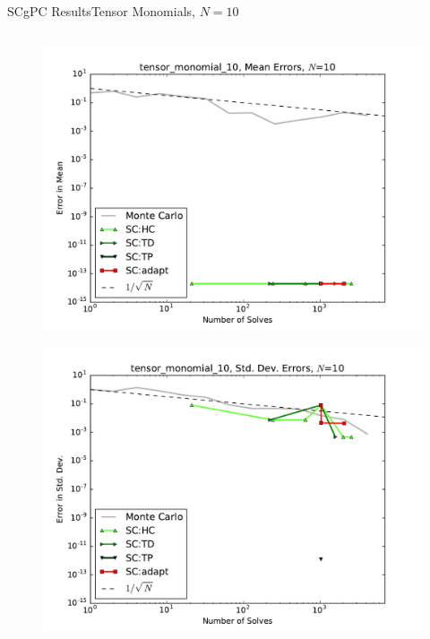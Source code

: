 \documentclass{beamer}
\begin{document}
\begin{frame}{SCgPC Results}{Tensor Monomials, $N=10$}
\begin{columns}
\begin{column}{0.5\textwidth}
\begin{figure}[h!]
          \includegraphics[width=0.8\linewidth]{anlmodels/tensor_monomial_10_mean_errs_nohdmr}
        \end{figure}
        \vspace{-20pt}
        \begin{figure}[h!]
          \centering
          \includegraphics[width=0.8\linewidth]{anlmodels/tensor_monomial_10_variance_errs_nohdmr}
        \end{figure}
   \end{column}
 \end{columns}
\end{frame}
\end{document}
